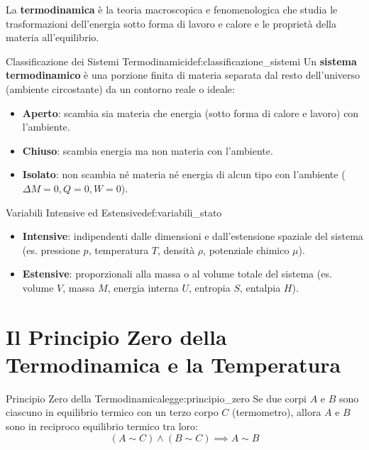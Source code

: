 La \textbf{termodinamica} è la teoria macroscopica e fenomenologica che studia le trasformazioni dell'energia sotto forma di lavoro e calore e le proprietà della materia all'equilibrio.

\begin{definizione}{Classificazione dei Sistemi Termodinamici}{def:classificazione_sistemi}
Un \textbf{sistema termodinamico} è una porzione finita di materia separata dal resto dell'universo (ambiente circostante) da un contorno reale o ideale:
\begin{itemize}
    \item \textbf{Aperto}: scambia sia materia che energia (sotto forma di calore e lavoro) con l'ambiente.
    \item \textbf{Chiuso}: scambia energia ma non materia con l'ambiente.
    \item \textbf{Isolato}: non scambia né materia né energia di alcun tipo con l'ambiente ($\Delta M = 0, Q = 0, W = 0$).
\end{itemize}
\end{definizione}

\begin{definizione}{Variabili Intensive ed Estensive}{def:variabili_stato}
\begin{itemize}
    \item \textbf{Intensive}: indipendenti dalle dimensioni e dall'estensione spaziale del sistema (es. pressione $p$, temperatura $T$, densità $\rho$, potenziale chimico $\mu$).
    \item \textbf{Estensive}: proporzionali alla massa o al volume totale del sistema (es. volume $V$, massa $M$, energia interna $U$, entropia $S$, entalpia $H$).
\end{itemize}
\end{definizione}

\section{Il Principio Zero della Termodinamica e la Temperatura}
\label{sec:principio_zero}

\begin{legge}{Principio Zero della Termodinamica}{legge:principio_zero}
Se due corpi $A$ e $B$ sono ciascuno in equilibrio termico con un terzo corpo $C$ (termometro), allora $A$ e $B$ sono in reciproco equilibrio termico tra loro:
\begin{equation}
    (A \sim C) \land (B \sim C) \implies A \sim B
\end{equation}
\end{legge}

